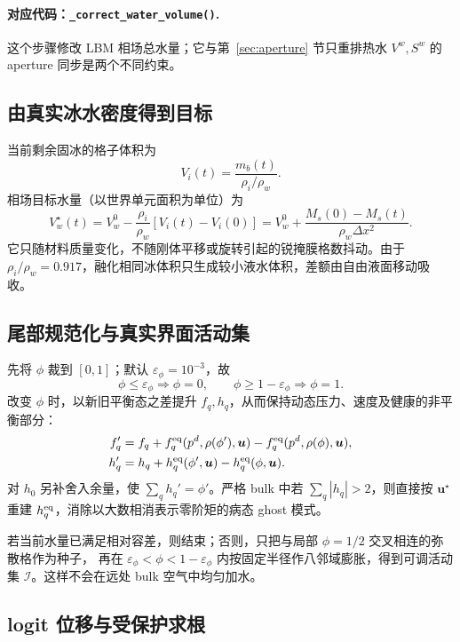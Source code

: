 \documentclass[UTF8,zihao=-4]{ctexart}
\newcommand{\vect}[1]{\boldsymbol{#1}}
\newcommand{\code}[1]{\texttt{#1}}
\newcommand{\stepname}[1]{\paragraph{对应代码：\code{#1}.}}
\numberwithin{equation}{section}
\begin{document}
\stepname{\_correct\_water\_volume()}
这个步骤修改 LBM 相场总水量；它与第~\ref{sec:aperture} 节只重排热水 $V^w,S^w$ 的 aperture
同步是两个不同约束。

\subsection{由真实冰水密度得到目标}

当前剩余固冰的格子体积为
\begin{equation}
  V_i(t)=\frac{m_b(t)}{\rho_i/\rho_w}.
\end{equation}
相场目标水量（以世界单元面积为单位）为
\begin{equation}
  V_w^\star(t)=V_w^0-\frac{\rho_i}{\rho_w}[V_i(t)-V_i(0)]
  =V_w^0+\frac{M_s(0)-M_s(t)}{\rho_w\Delta x^2}.
  \label{eq:water-volume-target}
\end{equation}
它只随材料质量变化，不随刚体平移或旋转引起的锐掩膜格数抖动。由于
$\rho_i/\rho_w=0.917$，融化相同冰体积只生成较小液水体积，差额由自由液面移动吸收。

\subsection{尾部规范化与真实界面活动集}

先将 $\phi$ 裁到 $[0,1]$；默认 $\varepsilon_\phi=10^{-3}$，故
\begin{equation}
  \phi\le\varepsilon_\phi\Rightarrow\phi=0,
  \qquad
  \phi\ge1-\varepsilon_\phi\Rightarrow\phi=1.
  \label{eq:phase-canonicalization}
\end{equation}
改变 $\phi$ 时，以新旧平衡态之差提升 $f_q,h_q$，从而保持动态压力、速度及健康的非平衡部分：
\begin{align}
 f_q'&=f_q+f_q^{\rm eq}(p^d,\rho(\phi'),\vect u)
             -f_q^{\rm eq}(p^d,\rho(\phi),\vect u),\\
 h_q'&=h_q+h_q^{\rm eq}(\phi',\vect u)
             -h_q^{\rm eq}(\phi,\vect u).
 \label{eq:phase-population-lift}
\end{align}
对 $h_0$ 另补舍入余量，使 $\sum_qh_q'=\phi'$。严格 bulk 中若 $\sum_q|h_q|>2$，则直接按
$\vect u^\star$ 重建 $h_q^{\rm eq}$，消除以大数相消表示零阶矩的病态 ghost 模式。

若当前水量已满足相对容差，则结束；否则，只把与局部 $\phi=1/2$ 交叉相连的弥散格作为种子，
再在 $\varepsilon_\phi<\phi<1-\varepsilon_\phi$ 内按固定半径作八邻域膨胀，得到可调活动集
$\mathcal I$。这样不会在远处 bulk 空气中均匀加水。

\subsection{logit 位移与受保护求根}
\end{document}
